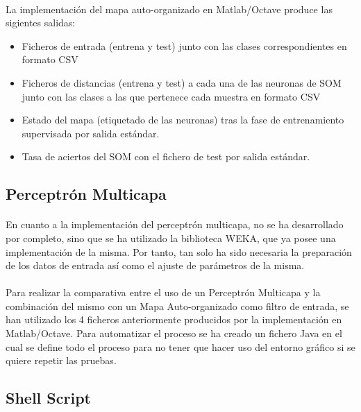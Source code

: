 \documentclass[10pt, a4paper,spanish]{article}
\begin{document}
			\paragraph{}
			La implementación del mapa auto-organizado en Matlab/Octave produce las sigientes salidas:

			\begin{itemize}
				\item Ficheros de entrada (entrena y test) junto con las clases correspondientes en formato CSV
				\item Ficheros de distancias (entrena y test) a cada una de las neuronas de SOM junto con las clases a las que pertenece cada muestra en formato CSV
				\item Estado del mapa (etiquetado de las neuronas) tras la fase de entrenamiento supervisada por salida estándar.
				\item Tasa de aciertos del SOM con el fichero de test por salida estándar.
			\end{itemize}

		\subsection{Perceptrón Multicapa}

			\paragraph{}
			En cuanto a la implementación del perceptrón multicapa, no se ha desarrollado por completo, sino que se ha utilizado la biblioteca WEKA, que ya posee una implementación de la misma. Por tanto, tan solo ha sido necesaria la preparación de los datos de entrada así como el ajuste de parámetros de la misma.

			\paragraph{}
			Para realizar la comparativa entre el uso de un Perceptrón Multicapa y la combinación del mismo con un Mapa Auto-organizado como filtro de entrada, se han utilizado los 4 ficheros anteriormente producidos por la implementación en Matlab/Octave. Para automatizar el proceso se ha creado un fichero Java en el cual se define todo el proceso para no tener que hacer uso del entorno gráfico si se quiere repetir las pruebas.

		\subsection{Shell Script}
\end{document}
